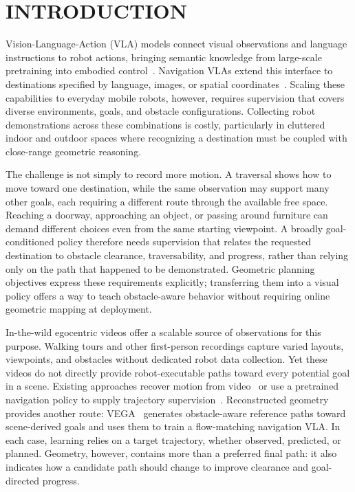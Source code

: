 \documentclass[letterpaper, 10 pt, conference]{ieeeconf}  %
\begin{document}
\section{INTRODUCTION}
\label{sec:introduction}

Vision-Language-Action (VLA) models connect visual observations and
language instructions to robot actions, bringing semantic knowledge
from large-scale pretraining into embodied control~\cite{pi05}.
Navigation VLAs extend this interface to destinations specified by
language, images, or spatial coordinates~\cite{navila,omnivla}.
Scaling these capabilities to everyday mobile robots, however, requires
supervision that covers diverse environments, goals, and obstacle
configurations. Collecting robot demonstrations across these combinations
is costly, particularly in cluttered indoor and outdoor spaces where
recognizing a destination must be coupled with close-range geometric
reasoning.

The challenge is not simply to record more motion. A traversal shows how
to move toward one destination, while the same observation may support
many other goals, each requiring a different route through the available
free space. Reaching a doorway, approaching an object, or passing around
furniture can demand different choices even from the same starting
viewpoint. A broadly goal-conditioned policy therefore needs supervision
that relates the requested destination to obstacle clearance,
traversability, and progress, rather than relying only on the path that
happened to be demonstrated. Geometric planning objectives express these
requirements explicitly; transferring them into a visual policy offers a
way to teach obstacle-aware behavior without requiring online geometric
mapping at deployment.

In-the-wild egocentric videos offer a scalable source of observations for
this purpose. Walking tours and other first-person recordings capture
varied layouts, viewpoints, and obstacles without dedicated robot data
collection. Yet these videos do not directly provide robot-executable
paths toward every potential goal in a scene. Existing approaches recover
motion from video~\cite{citywalker} or use a pretrained navigation policy
to supply trajectory supervision~\cite{lelan}. Reconstructed geometry
provides another route: VEGA~\cite{vega} generates obstacle-aware reference
paths toward scene-derived goals and uses them to train a flow-matching
navigation VLA. In each case, learning relies on a target trajectory,
whether observed, predicted, or planned. Geometry, however, contains more
than a preferred final path: it also indicates how a candidate path
should change to improve clearance and goal-directed progress.
\end{document}
